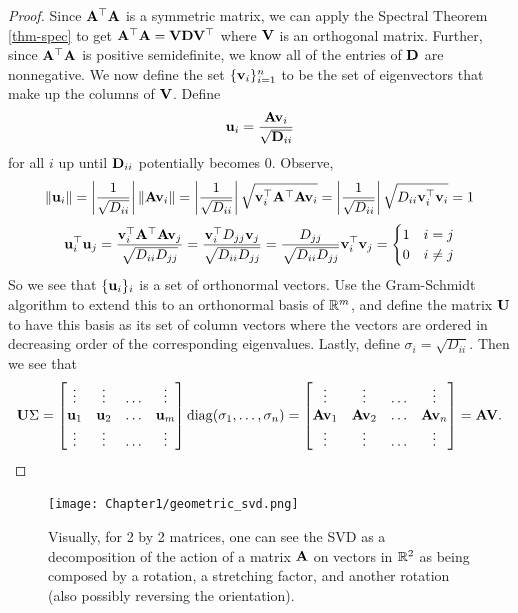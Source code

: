 \begin{proof}
Since $\MA^\top\MA $ is a symmetric matrix, we can apply the Spectral Theorem \ref{thm-spec} to get 
$\MA^\top \MA = \MV \MD \MV^\top$ where $\MV$ is an orthogonal matrix.
Further, since $\MA^\top\MA$ is positive semidefinite, we know all of the entries of $\MD$ are nonnegative. 
We now define the set $\{\vv_i\}_{i = 1}^n$ to be the set of eigenvectors that make up the columns of $\MV$. Define 
$$\vu_i = \frac{\MA \vv_i}{\sqrt{\MD_{ii}}}$$
for all $i$ up until $\MD_{ii}$ potentially becomes $0$.
Observe, 
$$\norm{\vu_i} =\left  |\frac{1}{\sqrt{D_{ii}}} \right | \norm{\MA\vv_i} =   \left |\frac{1}{\sqrt{D_{ii}}} \right | \sqrt{\vv_i^\top \MA^\top \MA \vv_i} = \left  |\frac{1}{\sqrt{D_{ii}}} \right| \sqrt{D_{ii} \vv_i^\top \vv_i} = 1$$
$$\vu_i^\top \vu_j =\frac{\vv_i^\top \MA^\top \MA \vv_j}{\sqrt{D_{ii} D_{jj}}} = \frac{\vv_i^\top D_{jj} \vv_j}{\sqrt{D_{ii} D_{jj}}} =  \frac{D_{jj}}{\sqrt{D_{ii} D_{jj}}} \vv_i^\top \vv_j = \begin{cases}
1 & i = j \\
0 & i \not = j
\end{cases}$$
So we see that $\{\vu_i\}_i$ is a set of orthonormal vectors. Use the Gram-Schmidt algorithm to extend this to an orthonormal basis of $\R^m$, and define the matrix $\MU$ to have this basis as its set of column vectors where the vectors are ordered in decreasing order of the corresponding eigenvalues.
Lastly, define 
$\sigma_i  = \sqrt{D_{ii}}$.
Then we see that 
$$\MU\Sigma = \begin{bmatrix}
\vdots & \vdots & \ldots & \vdots \\
\vu_1 & \vu_2 & \ldots & \vu_m \\
\vdots & \vdots & \ldots & \vdots
\end{bmatrix} \diag(\sigma_1,\dots,\sigma_n)= \begin{bmatrix}
\vdots & \vdots & \ldots & \vdots \\
\MA \vv_1 & \MA \vv_2 & \ldots & \MA \vv_n \\
\vdots & \vdots & \ldots & \vdots
\end{bmatrix}
= \MA\MV.$$
\end{proof}


 
 \begin{figure}
 \centering
  \texttt{[image: Chapter1/geometric\_svd.png]}
  \caption{ Visually, for 2 by 2 matrices, one can see the SVD as a decomposition of the action of a matrix $\MA$ on vectors in $\R^2$ as being composed by a rotation, a stretching factor, and another rotation (also possibly reversing the orientation).}
\end{figure}

